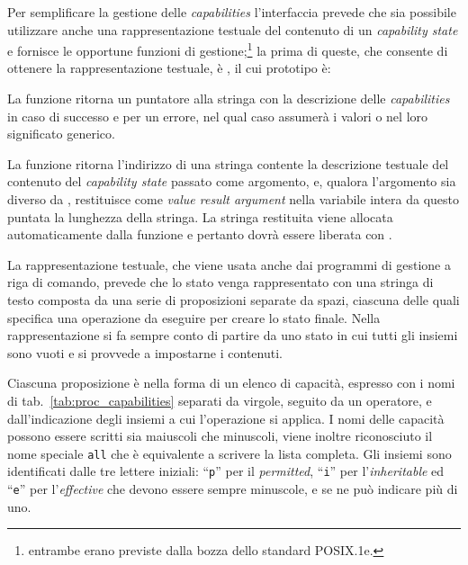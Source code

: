 Per semplificare la gestione delle \textit{capabilities} l'interfaccia prevede
che sia possibile utilizzare anche una rappresentazione testuale del contenuto
di un \textit{capability state} e fornisce le opportune funzioni di
gestione;\footnote{entrambe erano previste dalla bozza dello standard
  POSIX.1e.} la prima di queste, che consente di ottenere la rappresentazione
testuale, è , il cui prototipo è:

\begin{funcproto}{
}

{La funzione ritorna un puntatore alla stringa con la descrizione delle
  \textit{capabilities} in caso di successo e  per un errore, nel
  qual caso  assumerà i valori  o 
  nel loro significato generico.}
\end{funcproto}

La funzione ritorna l'indirizzo di una stringa contente la descrizione
testuale del contenuto del \textit{capability state}  passato come
argomento, e, qualora l'argomento  sia diverso da ,
restituisce come \textit{value result argument} nella variabile intera da
questo puntata la lunghezza della stringa. La stringa restituita viene
allocata automaticamente dalla funzione e pertanto dovrà essere liberata con
.

La rappresentazione testuale, che viene usata anche dai programmi di gestione a
riga di comando, prevede che lo stato venga rappresentato con una stringa di
testo composta da una serie di proposizioni separate da spazi, ciascuna delle
quali specifica una operazione da eseguire per creare lo stato finale. Nella
rappresentazione si fa sempre conto di partire da uno stato in cui tutti gli
insiemi sono vuoti e si provvede a impostarne i contenuti.

Ciascuna proposizione è nella forma di un elenco di capacità, espresso con i
nomi di tab.~\ref{tab:proc_capabilities} separati da virgole, seguito da un
operatore, e dall'indicazione degli insiemi a cui l'operazione si applica. I
nomi delle capacità possono essere scritti sia maiuscoli che minuscoli, viene
inoltre riconosciuto il nome speciale \texttt{all} che è equivalente a
scrivere la lista completa. Gli insiemi sono identificati dalle tre lettere
iniziali: ``\texttt{p}'' per il \textit{permitted}, ``\texttt{i}'' per
l'\textit{inheritable} ed ``\texttt{e}'' per l'\textit{effective} che devono
essere sempre minuscole, e se ne può indicare più di uno.

